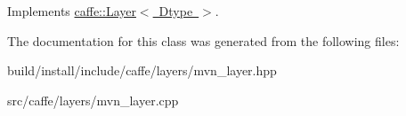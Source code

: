 Implements \mbox{\hyperlink{classcaffe_1_1_layer_a7fe981e8af8d93d587acf2a952be563d}{caffe\+::\+Layer$<$ Dtype $>$}}.



The documentation for this class was generated from the following files\+:\begin{DoxyCompactItemize}
\item 
build/install/include/caffe/layers/mvn\+\_\+layer.\+hpp\item 
src/caffe/layers/mvn\+\_\+layer.\+cpp\end{DoxyCompactItemize}
